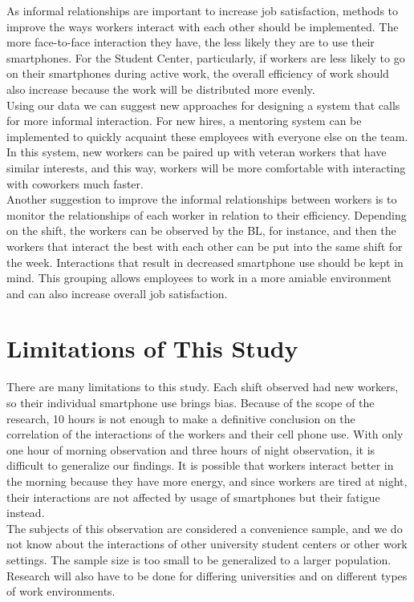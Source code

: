\documentclass[letterpaper, 12pt]{report}
\begin{document}
	As informal relationships are important to increase job satisfaction, methods to improve the ways workers interact with each other should be implemented. The more face-to-face interaction  they have, the less likely they are to use their smartphones. For the Student Center, particularly, if workers are less likely to go on their smartphones during active work, the overall efficiency of work should also increase because the work will be distributed more evenly.\\
	
	Using our data we can suggest new approaches for designing a system that calls for more informal interaction. For new hires, a mentoring system can be implemented to quickly acquaint these employees with everyone else on the team. In this system, new workers can be paired up with veteran workers that have similar interests, and this way, workers will be more comfortable with interacting with coworkers much faster.\\
	
	Another suggestion to improve the informal relationships between workers is to monitor the relationships of each worker in relation to their efficiency. Depending on the shift, the workers can be observed by the BL, for instance, and then the workers that interact the best with each other can be put into the same shift for the week. Interactions that result in decreased smartphone use should be kept in mind. This grouping allows employees to work in a more amiable environment and can also increase overall job satisfaction.

	\section{Limitations of This Study}
	
	There are many limitations to this study. Each shift observed had new workers, so their individual smartphone use brings bias. Because of the scope of the research, 10 hours is not enough to make a definitive conclusion on the correlation of the interactions of the workers and their cell phone use. With only one hour of morning observation and three hours of night observation, it is difficult to generalize our findings. It is possible that workers interact better in the morning because they have more energy, and since workers are tired at night, their interactions are not affected by usage of smartphones but their fatigue instead.\\
	
	The subjects of this observation are considered a convenience sample, and we do not know about the interactions of other university student centers or other work settings. The sample size is too small to be generalized to a larger population. Research will also have to be done for differing universities and on different types of work environments.\\
	
\end{document}
